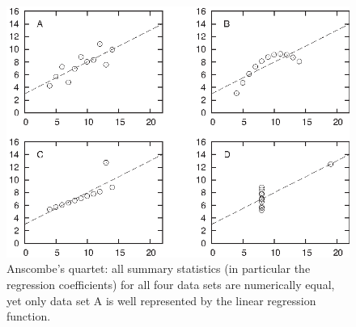 \begin{figure}
    \centerline{\includegraphics{img/anscombe}}
  \caption{Anscombe's quartet: all summary statistics (in particular
    the regression coefficients) for all four data sets are
    numerically equal, yet only data set A is well represented by the
    linear regression function.}
  \label{fig:anscombe}
\end{figure}

